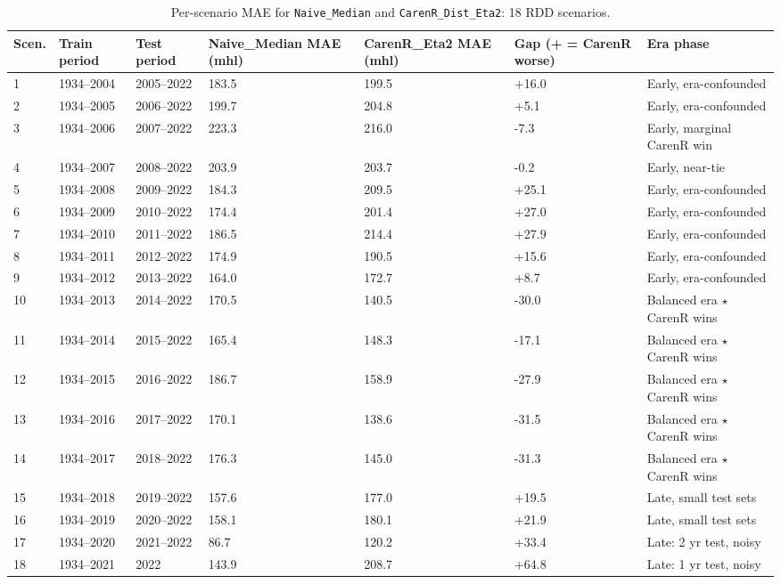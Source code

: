 \begin{table}[htbp]
  \centering
  \caption{Per-scenario MAE for \texttt{Naive\_Median} and \texttt{CarenR\_Dist\_Eta2}: 18 RDD scenarios.}\label{tab:ch5b_1}
  \small
  \begin{adjustbox}{max width=\textwidth}
    \begin{tabularx}{\textwidth}{p{0.7cm}|p{1.6cm}|p{1.6cm}|p{1.5cm}|p{1.5cm}|p{1.6cm}|X}
  \toprule
  Scen. & Train period & Test period & Naive\_Median
MAE (mhl) & CarenR\_Eta2
MAE (mhl) & Gap
(+ = CarenR worse) & Era phase \\
  \midrule
  1 & 1934--2004 & 2005--2022 & 183.5 & 199.5 & +16.0 & Early, era-confounded \\
  2 & 1934--2005 & 2006--2022 & 199.7 & 204.8 & +5.1 & Early, era-confounded \\
  3 & 1934--2006 & 2007--2022 & 223.3 & 216.0 & -7.3 & Early, marginal CarenR win \\
  4 & 1934--2007 & 2008--2022 & 203.9 & 203.7 & -0.2 & Early, near-tie \\
  5 & 1934--2008 & 2009--2022 & 184.3 & 209.5 & +25.1 & Early, era-confounded \\
  6 & 1934--2009 & 2010--2022 & 174.4 & 201.4 & +27.0 & Early, era-confounded \\
  7 & 1934--2010 & 2011--2022 & 186.5 & 214.4 & +27.9 & Early, era-confounded \\
  8 & 1934--2011 & 2012--2022 & 174.9 & 190.5 & +15.6 & Early, era-confounded \\
  9 & 1934--2012 & 2013--2022 & 164.0 & 172.7 & +8.7 & Early, era-confounded \\
  10 & 1934--2013 & 2014--2022 & 170.5 & 140.5 & -30.0 & Balanced era $\star$ CarenR wins \\
  11 & 1934--2014 & 2015--2022 & 165.4 & 148.3 & -17.1 & Balanced era $\star$ CarenR wins \\
  12 & 1934--2015 & 2016--2022 & 186.7 & 158.9 & -27.9 & Balanced era $\star$ CarenR wins \\
  13 & 1934--2016 & 2017--2022 & 170.1 & 138.6 & -31.5 & Balanced era $\star$ CarenR wins \\
  14 & 1934--2017 & 2018--2022 & 176.3 & 145.0 & -31.3 & Balanced era $\star$ CarenR wins \\
  15 & 1934--2018 & 2019--2022 & 157.6 & 177.0 & +19.5 & Late, small test sets \\
  16 & 1934--2019 & 2020--2022 & 158.1 & 180.1 & +21.9 & Late, small test sets \\
  17 & 1934--2020 & 2021--2022 & 86.7 & 120.2 & +33.4 & Late: 2 yr test, noisy \\
  18 & 1934--2021 & 2022 & 143.9 & 208.7 & +64.8 & Late: 1 yr test, noisy \\
  \bottomrule
\end{tabularx}
  \end{adjustbox}

\end{table}



